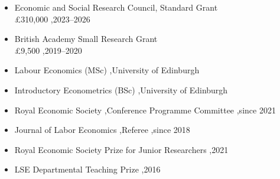 \documentclass[letterpaper,10pt]{article}
\begin{document}

\begin{itemize}
\item Economic and Social Research Council, Standard Grant\\
£310,000 \sep 2023--2026
\item British Academy Small Research Grant\\
£9,500 \sep 2019--2020
\end{itemize}


\begin{itemize}
\item Labour Economics (MSc) \sep University of Edinburgh
\item Introductory Econometrics (BSc) \sep University of Edinburgh
\end{itemize}


\begin{itemize}
\item Royal Economic Society \sep Conference Programme Committee \sep since 2021
\item Journal of Labor Economics \sep Referee \sep since 2018
\end{itemize}


\begin{itemize}
\item Royal Economic Society Prize for Junior Researchers \sep 2021
\item LSE Departmental Teaching Prize \sep 2016
\end{itemize}
\end{document}
